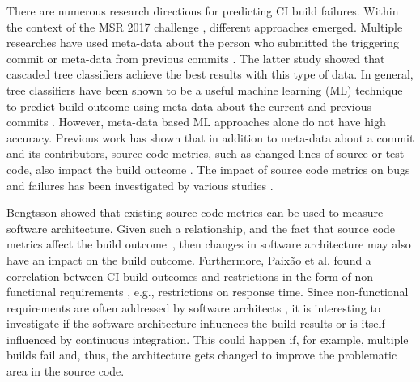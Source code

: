 \documentclass[sigplan, anonymous, review]{acmart}
\newcommand{\sn}[1]{{\color{blue}\textbf{Sarah:}~#1}}
\newcommand{\jk}[1]{{\color{violet}\textbf{Johannes:}~#1}}
\begin{document}
There are numerous research directions for predicting CI build failures. Within the context of the MSR 2017 challenge \cite{TravisTorrent}, different approaches emerged.
Multiple researches have used meta-data about the person who submitted the triggering commit \cite{ContrInvolv} or meta-data from previous commits \cite{Pred-Cascade}. The latter study showed that cascaded tree classifiers achieve the best results with this type of data. 
In general, tree classifiers have been shown to be a useful machine learning (ML) technique to predict build outcome using meta data about the current and previous commits \cite{Pred-Tree}. 
However, meta-data based ML approaches alone do not have high accuracy.
Previous work has shown that in addition to meta-data about a commit and its contributors, source code metrics, such as changed lines of source or test code, also impact the build outcome \cite{FailsCorr}. The impact of source code metrics on bugs and failures has been investigated by various studies \cite{MetricsSource1, MetricsSource2}. 

Bengtsson \cite{arc-metrics} showed that existing source code metrics can be used to measure software architecture. 
Given such a relationship, and the fact that source code metrics affect the build outcome~\cite{MetricsSource1, MetricsSource2, FailsCorr}, then changes in software architecture may also have an impact on the build outcome.
Furthermore, Paix\~{a}o et al. found a correlation between CI build outcomes and restrictions in the form of non-functional requirements \cite{Fail-NFReq}, e.g., restrictions on response time.
Since non-functional requirements are often addressed by software architects \cite{NFR-Architects}, it is interesting to investigate if the software architecture influences the build results or is itself influenced by continuous integration. 
This could happen if, for example, multiple builds fail and, thus, the architecture gets changed to improve the problematic area in the source code.

\end{document}
